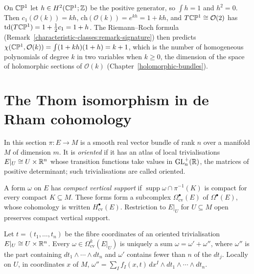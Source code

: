\begin{example}\label{characteristic-classes:example-chern-character-cp1}
On $\mathbb{C}\mathbb{P}^1$ let $h \in H^2(\mathbb{C}\mathbb{P}^1; \mathbb{Z})$ be the positive generator, so $\int h = 1$ and $h^2 = 0$. Then $c_1(\mathcal{O}(k)) = kh$, $\mathrm{ch}(\mathcal{O}(k)) = e^{kh} = 1 + kh$, and
$T\mathbb{C}\mathbb{P}^1 \cong \mathcal{O}(2)$ has $\mathrm{td}(T\mathbb{C}\mathbb{P}^1) = 1 + \frac12c_1 = 1 + h$. The Riemann--Roch formula (Remark~\ref{characteristic-classes:remark-signature}) then predicts
$\chi(\mathbb{C}\mathbb{P}^1, \mathcal{O}(k)) = \int(1 + kh)(1 + h) = k + 1$, which is the number of homogeneous polynomials of degree $k$ in two variables when $k \geq 0$, the dimension of
the space of holomorphic sections of $\mathcal{O}(k)$ (Chapter~\ref{holomorphic-bundles}).
\end{example}

\section{The Thom isomorphism in de Rham cohomology}\label{characteristic-classes:section-thom}

In this section $\pi \colon E \to M$ is a smooth real vector bundle of rank $n$ over a manifold $M$ of dimension $m$. It is \emph{oriented} if it has an atlas of local trivialisations $E|_U \cong U \times \mathbb{R}^n$ whose transition
functions take values in $\mathrm{GL}_n^+(\mathbb{R})$, the matrices of positive determinant; such trivialisations are called oriented.

\begin{definition}\label{characteristic-classes:definition-vertical-support}
A form $\omega$ on $E$ has \emph{compact vertical support} if $\operatorname{supp}\omega \cap \pi^{-1}(K)$ is compact for every compact $K \subseteq M$. These forms form a subcomplex $\Omega^\bullet_{\mathrm{cv}}(E)$ of $\Omega^\bullet(E)$,
whose cohomology is written $H^\bullet_{\mathrm{cv}}(E)$. Restriction to $E|_U$ for $U \subseteq M$ open preserves compact vertical support.
\end{definition}

Let $t = (t_1, \ldots, t_n)$ be the fibre coordinates of an oriented trivialisation $E|_U \cong U \times \mathbb{R}^n$. Every $\omega \in \Omega^k_{\mathrm{cv}}(E|_U)$ is uniquely a sum $\omega = \omega' + \omega''$, where $\omega''$ is the part containing
$dt_1 \wedge \cdots \wedge dt_n$ and $\omega'$ contains fewer than $n$ of the $dt_j$. Locally on $U$, in coordinates $x$ of $M$, $\omega'' = \sum_If_I(x, t)\,dx^I \wedge dt_1 \wedge \cdots \wedge dt_n$.

